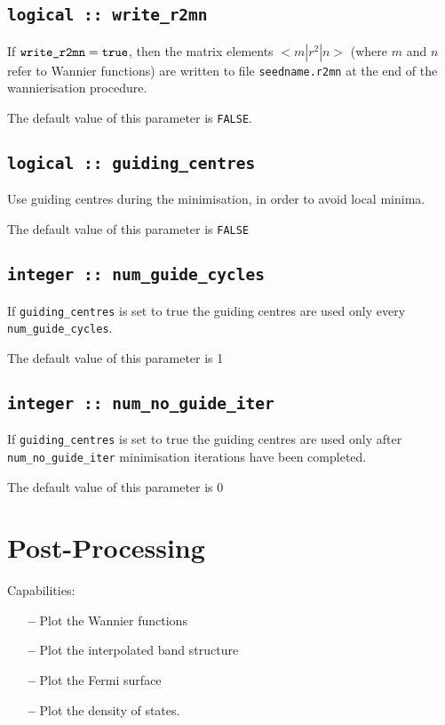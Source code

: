 \subsection[write\_r2mn]{\tt logical :: write\_r2mn}

If $\verb#write_r2mn#=\verb#true#$, then the matrix elements
$<m|r^2|n>$ (where $m$ and $n$ refer to Wannier functions) are written
to file \verb#seedname.r2mn# at the end of the wannierisation procedure.

The default value of this parameter is \verb#FALSE#.


\subsection[guiding\_centres]{\tt logical :: guiding\_centres}
Use guiding centres during the minimisation, in order to avoid
local minima.

The default value of this parameter is \verb#FALSE#

\subsection[num\_guide\_cycles]{\tt integer :: num\_guide\_cycles}
If \verb#guiding_centres# is set to true the
guiding centres are used only every \verb#num_guide_cycles#.

The default value of this parameter is 1

\subsection[num\_no\_guide\_iter]{\tt integer :: num\_no\_guide\_iter}
If \verb#guiding_centres# is set to true the
guiding centres are used only after \verb#num_no_guide_iter#
minimisation iterations have been completed.

The default value of this parameter is 0



\section{Post-Processing}

 Capabilities:

\begin{itemize}
\item[{\bf --}]  Plot the Wannier functions
\item[{\bf --}]  Plot the interpolated band structure 		     
\item[{\bf --}]  Plot the Fermi surface 			     
\item[{\bf --}]  Plot the density of states.
\end{itemize}


